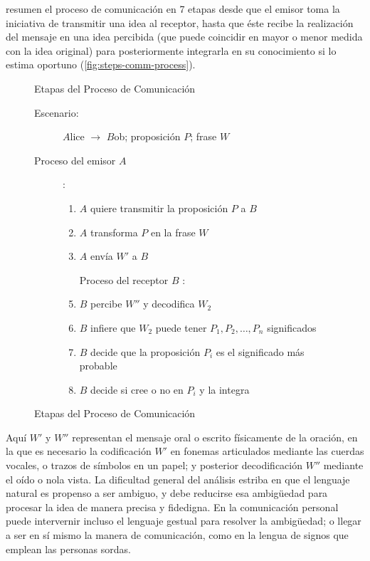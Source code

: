 \citet{Russell2003} resumen el proceso de comunicación en 7 etapas desde que el emisor toma la iniciativa de transmitir una idea al receptor, hasta que éste recibe la realización del mensaje en una idea percibida (que puede coincidir en mayor o menor medida con la idea original) para posteriormente integrarla en su conocimiento si lo estima oportuno (\autoref{fig:steps-comm-process}).

\begin{figure}[htbp]
\centering
\begin{framed}
\begin{minipage}{\textwidth}
\begin{center}
{\large \textsf{Etapas del Proceso de Comunicación}}
\end{center}
\begin{description}
\item[Escenario:] $A$lice $\longrightarrow$ $B$ob; proposición $P$; frase $W$
\item[Proceso del emisor $A$]:
\begin{enumerate}
\item {} $A$ quiere transmitir la proposición $P$ a $B$
\item {} $A$ transforma $P$ en la frase $W$
\item {} $A$ envía $W'$ a $B$
\item[Proceso del receptor $B$]:
\item {} $B$ percibe $W''$ y decodifica $W_2$
\item {} $B$ infiere que $W_2$ puede tener $P_1, P_2, \ldots, P_n$ significados
\item {} $B$ decide que la proposición $P_i$ es el significado más probable
\item {} $B$ decide si cree o no en $P_i$ y la integra
\end{enumerate}
\end{description}
\end{minipage}
\end{framed}
\caption[Etapas del Proceso de Comunicación]{Etapas del Proceso de Comunicación \citep[pp. 792]{Russell2003}}
\label{fig:steps-comm-process}
\end{figure}

Aquí $W'$ y $W''$ representan el mensaje oral o escrito físicamente de la oración, en la que es necesario la codificación $W'$ en fonemas articulados mediante las cuerdas vocales, o trazos de símbolos en un papel; y posterior decodificación $W''$ mediante el oído o nola vista. La dificultad general del análisis estriba en que el lenguaje natural es propenso a ser ambiguo, y debe reducirse esa ambigüedad para procesar la idea de manera precisa y fidedigna. En la comunicación personal puede intervernir incluso el lenguaje gestual para resolver la ambigüedad; o llegar a ser en sí mismo la manera de comunicación, como en la lengua de signos que emplean las personas sordas.

